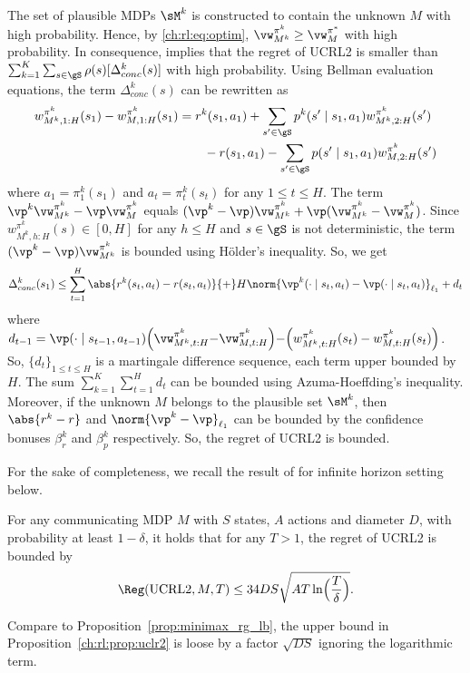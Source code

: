 The set of plausible MDPs $\sM^k$ is constructed to contain the unknown $M$ with high probability.
Hence, by \eqref{ch:rl:eq:optim}, $\vw^{\pi^k}_{M^k}\ge \vw^{\pi^*}_M$ with high probability. 
In consequence,  implies that the regret of UCRL2 is smaller than ${\sum_{k=1}^K\sum_{s\in\gS}\rho(s)[\Delta_{conc}^k(s)]}$ with high probability.
Using Bellman evaluation equations, the term $\Delta_{conc}^k(s)$ can be rewritten as
\begin{align}
    w^{\pi^k}_{M^k,1:H}(s_1) -w^{\pi^k}_{M,1:H}(s_1)
    &= r^k(s_1,a_1)+\sum_{s'\in\gS}p^k(s'\mid s_1,a_1)w^{\pi^k}_{M^k,2:H}(s') \nonumber\\
    &\qquad -r(s_1,a_1)-\sum_{s'\in\gS}p(s'\mid s_1,a_1)w^{\pi^k}_{M,2:H}(s') \label{eq:decom}
\end{align}
where $a_1=\pi^k_1(s_1)$ and $a_t=\pi^k_t(s_t)$ for any $1\le t\le H$.
The term $\vp^k\vw^{\pi^k}_{M^k}-\vp\vw^{\pi^k}_M$ equals $(\vp^k-\vp)\vw^{\pi^k}_{M^k} +\vp(\vw^{\pi^k}_{M^k}-\vw^{\pi^k}_M)$.
Since $w^{\pi^k}_{M^k,h:H}(s)\in [0,H]$ for any $h\le H$ and $s\in\gS$ is not deterministic, the term $(\vp^k-\vp)\vw^{\pi^k}_{M^k}$ is bounded using Hölder's inequality.
So, we get
\begin{equation}
    \label{ch:rl:eq:delta_conc}
    \Delta_{conc}^k(s_1)\le\sum_{t=1}^{H} \abs{r^k(s_t,a_t)-r(s_t,a_t)}{+}H\norm{\vp^k(\cdot\mid s_t,a_t)-\vp(\cdot\mid s_t,a_t)}_{\ell_1} +d_t
\end{equation}
where $d_{t-1}=\vp(\cdot\mid s_{t{-}1},a_{t{-}1})\Bigl(\vw^{\pi^k}_{M^k,t:H} {-}\vw^{\pi^k}_{M,t:H}\Bigr) {-}\Bigl(w^{\pi^k}_{M^k,t:H}(s_{t}) -w^{\pi^k}_{M,t:H}(s_{t})\Bigr)$.
So, $\{d_t\}_{1\le t\le H}$ is a martingale difference sequence, each term upper bounded by $H$.
The sum $\sum_{k=1}^K\sum_{t=1}^Hd_t$ can be bounded using Azuma-Hoeffding's inequality.
Moreover, if the unknown $M$ belongs to the plausible set $\sM^k$, then $\abs{r^k-r}$ and $\norm{\vp^k-\vp}_{\ell_1}$ can be bounded by the confidence bonuses $\beta_r^k$ and $\beta_p^k$ respectively.
So, the regret of UCRL2 is bounded.

For the sake of completeness, we recall the result of \cite{jaksch2010near} for infinite horizon setting below.
\begin{prop}
    \label{ch:rl:prop:uclr2}
    For any communicating MDP $M$ with $S$ states, $A$ actions and diameter $D$, with probability at least $1-\delta$, it holds that for any $T>1$, the regret of UCRL2 is bounded by
    \begin{align*}
        \Reg(\mathrm{UCRL2}, M, T) \le 34DS\sqrt{AT\ln\Bigl(\frac{T}{\delta}\Bigr)}.
    \end{align*}
\end{prop}
Compare to Proposition~\ref{prop:minimax_rg_lb}, the upper bound in Proposition~\ref{ch:rl:prop:uclr2} is loose by a factor $\sqrt{DS}$ ignoring the logarithmic term.

